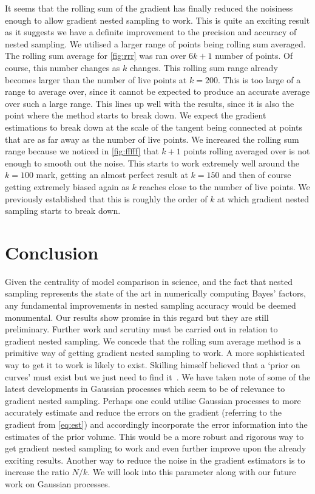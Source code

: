 It seems that the rolling sum of the gradient has finally reduced the noisiness enough to allow gradient nested sampling to work. This is quite an exciting result as it suggests we have a definite improvement to the precision and accuracy of nested sampling. We utilised a larger range of points being rolling sum averaged. The rolling sum average for \cref{fig:rrr} was ran over  $6k+1$ number of points. Of course, this number changes as $k$ changes. This rolling sum range already becomes larger than the number of live points at $k=200$. This is too large of a range to average over, since it cannot be expected to produce an accurate average over such a large range. This lines up well with the results, since it is also the point where the method starts to break down. We expect the gradient estimations to break down at the scale of the tangent being connected at points that are as far away as the number of live points. We increased the rolling sum range because we noticed in \cref{fig:fffff} that $k+1$ points rolling averaged over is not enough to smooth out the noise. This starts to work extremely well around the $k=100$ mark, getting an almost perfect result at $k=150$ and then of course getting extremely biased again as $k$ reaches close to the number of live points. We previously established that this is roughly the order of $k$ at which gradient nested sampling starts to break down. 


\section{Conclusion}

Given the centrality of model comparison in science, and the fact that nested sampling represents the state of the art in numerically computing Bayes’ factors, any fundamental improvements in nested sampling accuracy would be deemed monumental. Our results show promise in this regard but they are still preliminary. Further work and scrutiny must be carried out in relation to gradient nested sampling. We concede that the rolling sum average method is a primitive way of getting gradient nested sampling to work. A more sophisticated way to get it to work is likely to exist. Skilling himself believed that a `prior on curves' must exist but we just need to find it~\cite{10.1214/06-BA127,paris2022}. We have taken note of some of the latest developments in Gaussian processes which seem to be of relevance to gradient nested sampling. Perhaps one could utilise Gaussian processes to more accurately estimate and reduce the errors on the gradient (referring to the gradient from \cref{eq:est}) and accordingly incorporate the error information into the estimates of the prior volume. This would be a more robust and rigorous way to get gradient nested sampling to work and even further improve upon the already exciting results. Another way to reduce the noise in the gradient estimators is to increase the ratio $N/k$. We will look into this parameter along with our future work on Gaussian processes.

